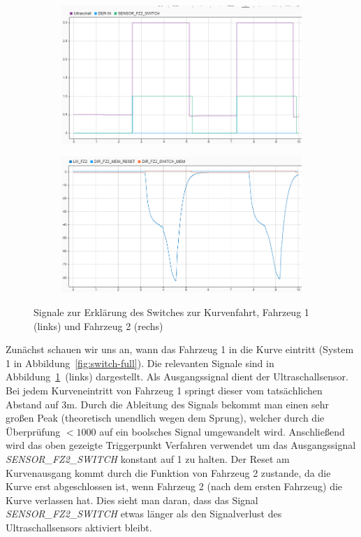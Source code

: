 \begin{figure}[hbt]
\centering
\begin{subfigure}{0.4\textwidth}
    \centering
    \includegraphics*[width=\textwidth]{figures/abstand_ultraschall.png}
\end{subfigure}
\begin{subfigure}{0.4\textwidth}
    \centering
    \includegraphics*[width=\textwidth]{figures/abstand_lenkw.png}
\end{subfigure}

    \caption{Signale zur Erklärung des Switches zur Kurvenfahrt, Fahrzeug 1
        (links) und Fahrzeug 2 (rechs)
    \label{fig:umschaltsign}}
\end{figure}    

Zunächst schauen wir uns an, wann das Fahrzeug 1 in die Kurve eintritt (System 1
in Abbildung~\ref{fig:switch-full}). Die relevanten Signale sind in
Abbildung~\ref{fig:umschaltsign}~(links) dargestellt. Als Ausgangssignal dient
der Ultraschallsensor. Bei jedem Kurveneintritt von Fahrzeug 1 springt dieser
vom tatsächlichen Abstand auf $3\mathrm{m}$. Durch die Ableitung des Signals
bekommt man einen sehr großen Peak (theoretisch unendlich wegen dem Sprung),
welcher durch die Überprüfung $<1000$ auf ein boolsches Signal umgewandelt wird.
Anschließend wird das oben gezeigte Triggerpunkt Verfahren verwendet um das
Ausgangssignal \textit{SENSOR\_FZ2\_SWITCH} konstant auf 1 zu halten. Der Reset
am Kurvenausgang kommt durch die Funktion von Fahrzeug 2 zustande, da die Kurve
erst abgeschlossen ist, wenn Fahrzeug 2 (nach dem ersten Fahrzeug) die Kurve
verlassen hat. Dies sieht man daran, dass das Signal
\textit{SENSOR\_FZ2\_SWITCH} etwas länger als den Signalverlust des
Ultraschallsensors aktiviert bleibt.

